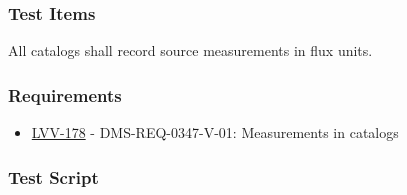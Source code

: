 \hypertarget{test-items-4}{%
\subsubsection{Test Items}\label{test-items-4}}

All catalogs shall record source measurements in flux units.

\hypertarget{requirements-5}{%
\subsubsection{Requirements}\label{requirements-5}}

\begin{itemize}
\tightlist
\item
  \href{https://jira.lsstcorp.org/browse/LVV-178}{LVV-178} -
  DMS-REQ-0347-V-01: Measurements in catalogs
\end{itemize}

\hypertarget{test-script-5}{%
\subsubsection{Test Script}\label{test-script-5}}

